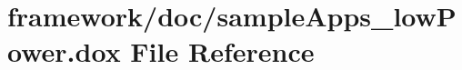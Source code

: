 \hypertarget{sample_apps__low_power_8dox}{}\section{framework/doc/sample\+Apps\+\_\+low\+Power.dox File Reference}
\label{sample_apps__low_power_8dox}
